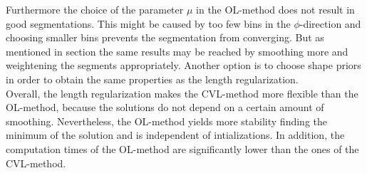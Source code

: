 Furthermore the choice of the parameter $\mu$ in the OL-method does not result in good segmentations. This might be caused by too few bins in the $\phi$-direction and choosing smaller bins prevents the segmentation from converging. But as mentioned in section  the same results may be reached by smoothing more and weightening the segments appropriately. Another option is to choose shape priors in order to obtain the same properties as the length regularization.\\

Overall, the length regularization makes the CVL-method more flexible than the OL-method, because the solutions do not depend on a certain amount of smoothing. Nevertheless, the OL-method yields more stability finding the minimum of the solution and is independent of intializations. In addition, the computation times of the OL-method are significantly lower than the ones of the CVL-method.